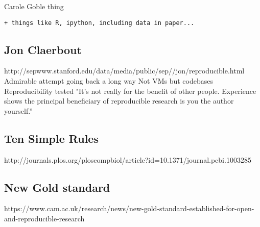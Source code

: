 \documentclass[11pt]{article}
\begin{document}
Carole Goble thing

\begin{verbatim}
+ things like R, ipython, including data in paper... 
\end{verbatim}


\subsection{Jon Claerbout}

http://sepwww.stanford.edu/data/media/public/sep//jon/reproducible.html
Admirable attempt going back a long way
Not VMs but codebases
Reproducibility tested 
"It's not really for the benefit of other people. Experience shows the principal beneficiary of reproducible research is you the author yourself.”

\subsection{Ten Simple Rules}
http://journals.plos.org/ploscompbiol/article?id=10.1371/journal.pcbi.1003285

\subsection{New Gold standard}
https://www.cam.ac.uk/research/news/new-gold-standard-established-for-open-and-reproducible-research
\end{document}
